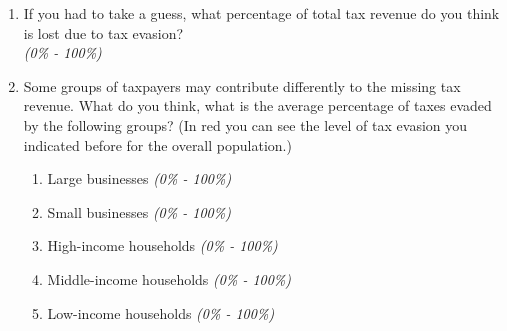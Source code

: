 \documentclass[11pt]{article}
\begin{document}
\begin{enumerate}[resume]
    \item If you had to take a guess, what percentage of total tax revenue do you think is lost due to tax evasion? \\
    \textit{(0\% - 100\%)}
    \item Some groups of taxpayers may contribute differently to the missing tax revenue. What do you think, what is the average percentage of taxes evaded by the following groups? (In red you can see the level of tax evasion you indicated before for the overall population.)
    \begin{enumerate}[label=\alph*)]
        \item Large businesses \textit{(0\% - 100\%)}
        \item Small businesses \textit{(0\% - 100\%)}
        \item High-income households \textit{(0\% - 100\%)}
        \item Middle-income households \textit{(0\% - 100\%)}
        \item Low-income households \textit{(0\% - 100\%)}
    \end{enumerate}
\end{enumerate}

\vspace{1em}
\end{document}
